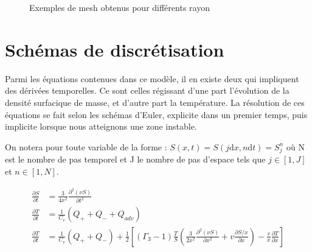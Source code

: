 \documentclass[a4paper,12pt]{article}
\begin{document}
\begin{figure}
  \centering
  \hspace{5pt}
  \caption{Exemples de mesh obtenus pour différents rayon}
\end{figure}

\section{Schémas de discrétisation}

Parmi les équations contenues dans ce modèle, il en existe deux qui impliquent des dérivées temporelles. Ce sont celles régissant d'une part l'évolution de la densité surfacique de masse, et d'autre part la température.
La résolution de ces équations se fait selon les schémas d'Euler, explicite dans un premier temps, puis implicite lorsque nous atteignons une zone instable.

On notera pour toute variable de la forme : $S(x,t) = S(j\text{d}x,n\text{d}t) = S^n_j$ où N est le nombre de pas temporel et J le nombre de pas d'espace tels que $j\in[1,J]$ et $n\in[1,N]$.


\begin{align}
	\frac{\partial S}{\partial t} &= \frac{3}{4 x^2}\frac{\partial^2 \left( \nu S \right)}{\partial t^2} \label{eq:diffSurfacique}\\
	\frac{\partial T}{\partial t} &= \frac{1}{C_v}\left(Q_+ + Q_- + Q_{adv}\right)\label{eq:diffTemperature}\\
	\frac{\partial T}{\partial t} &= \frac{1}{C_v}\left(Q_+ + Q_-\right) + \frac{1}{2}\left[(\Gamma_3 - 1)\frac{T}{S}\left(\frac{3}{2x^2}\frac{\partial^2(\nu S)}{\partial x^2} + v\frac{\partial S/x}{\partial x}\right) - \frac{v}{x}\frac{\partial T}{\partial x}\right]	\label{eq:diffTemperature}
\end{align}

\end{document}

